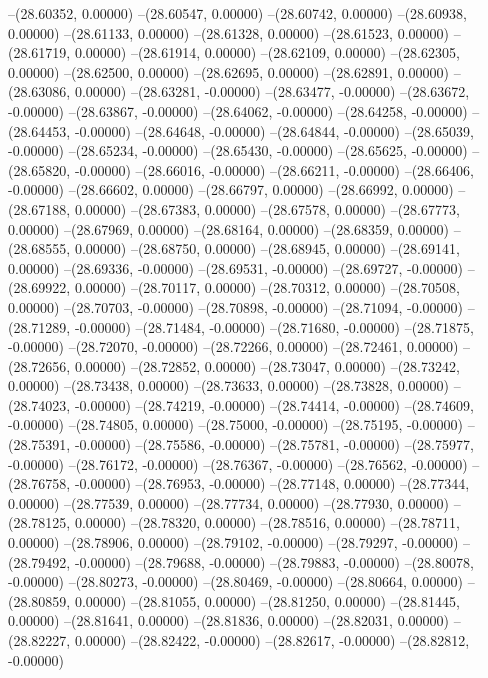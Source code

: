 --(28.60352, 0.00000)
--(28.60547, 0.00000)
--(28.60742, 0.00000)
--(28.60938, 0.00000)
--(28.61133, 0.00000)
--(28.61328, 0.00000)
--(28.61523, 0.00000)
--(28.61719, 0.00000)
--(28.61914, 0.00000)
--(28.62109, 0.00000)
--(28.62305, 0.00000)
--(28.62500, 0.00000)
--(28.62695, 0.00000)
--(28.62891, 0.00000)
--(28.63086, 0.00000)
--(28.63281, -0.00000)
--(28.63477, -0.00000)
--(28.63672, -0.00000)
--(28.63867, -0.00000)
--(28.64062, -0.00000)
--(28.64258, -0.00000)
--(28.64453, -0.00000)
--(28.64648, -0.00000)
--(28.64844, -0.00000)
--(28.65039, -0.00000)
--(28.65234, -0.00000)
--(28.65430, -0.00000)
--(28.65625, -0.00000)
--(28.65820, -0.00000)
--(28.66016, -0.00000)
--(28.66211, -0.00000)
--(28.66406, -0.00000)
--(28.66602, 0.00000)
--(28.66797, 0.00000)
--(28.66992, 0.00000)
--(28.67188, 0.00000)
--(28.67383, 0.00000)
--(28.67578, 0.00000)
--(28.67773, 0.00000)
--(28.67969, 0.00000)
--(28.68164, 0.00000)
--(28.68359, 0.00000)
--(28.68555, 0.00000)
--(28.68750, 0.00000)
--(28.68945, 0.00000)
--(28.69141, 0.00000)
--(28.69336, -0.00000)
--(28.69531, -0.00000)
--(28.69727, -0.00000)
--(28.69922, 0.00000)
--(28.70117, 0.00000)
--(28.70312, 0.00000)
--(28.70508, 0.00000)
--(28.70703, -0.00000)
--(28.70898, -0.00000)
--(28.71094, -0.00000)
--(28.71289, -0.00000)
--(28.71484, -0.00000)
--(28.71680, -0.00000)
--(28.71875, -0.00000)
--(28.72070, -0.00000)
--(28.72266, 0.00000)
--(28.72461, 0.00000)
--(28.72656, 0.00000)
--(28.72852, 0.00000)
--(28.73047, 0.00000)
--(28.73242, 0.00000)
--(28.73438, 0.00000)
--(28.73633, 0.00000)
--(28.73828, 0.00000)
--(28.74023, -0.00000)
--(28.74219, -0.00000)
--(28.74414, -0.00000)
--(28.74609, -0.00000)
--(28.74805, 0.00000)
--(28.75000, -0.00000)
--(28.75195, -0.00000)
--(28.75391, -0.00000)
--(28.75586, -0.00000)
--(28.75781, -0.00000)
--(28.75977, -0.00000)
--(28.76172, -0.00000)
--(28.76367, -0.00000)
--(28.76562, -0.00000)
--(28.76758, -0.00000)
--(28.76953, -0.00000)
--(28.77148, 0.00000)
--(28.77344, 0.00000)
--(28.77539, 0.00000)
--(28.77734, 0.00000)
--(28.77930, 0.00000)
--(28.78125, 0.00000)
--(28.78320, 0.00000)
--(28.78516, 0.00000)
--(28.78711, 0.00000)
--(28.78906, 0.00000)
--(28.79102, -0.00000)
--(28.79297, -0.00000)
--(28.79492, -0.00000)
--(28.79688, -0.00000)
--(28.79883, -0.00000)
--(28.80078, -0.00000)
--(28.80273, -0.00000)
--(28.80469, -0.00000)
--(28.80664, 0.00000)
--(28.80859, 0.00000)
--(28.81055, 0.00000)
--(28.81250, 0.00000)
--(28.81445, 0.00000)
--(28.81641, 0.00000)
--(28.81836, 0.00000)
--(28.82031, 0.00000)
--(28.82227, 0.00000)
--(28.82422, -0.00000)
--(28.82617, -0.00000)
--(28.82812, -0.00000)
